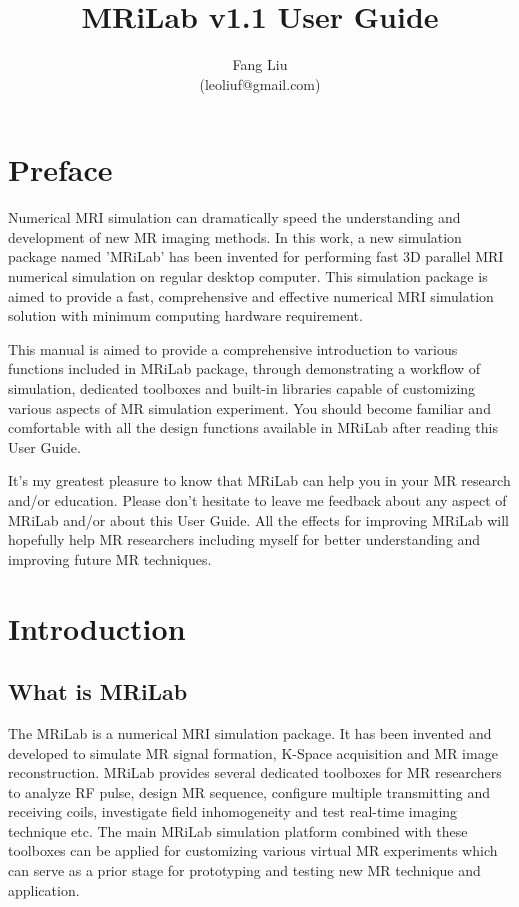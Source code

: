 \documentclass{book}%
\begin{document}
\frontmatter
\title{MRiLab v1.1 User Guide}
\author{Fang Liu \\ (leoliuf@gmail.com)}
\maketitle
\chapter*{Preface}

Numerical MRI simulation can dramatically speed the understanding and development of new MR imaging methods. In this work, a new simulation package named 'MRiLab' has been invented for performing fast 3D parallel MRI numerical simulation on regular desktop computer. This simulation package is aimed to provide a fast, comprehensive and effective numerical MRI simulation solution with minimum computing hardware requirement.

This manual is aimed to provide a comprehensive introduction to various functions included in MRiLab package, through demonstrating a workflow of simulation, dedicated toolboxes and built-in libraries capable of customizing various aspects of MR simulation experiment. You should become familiar and comfortable with all the design functions available in MRiLab after reading this User Guide.

It's my greatest pleasure to know that MRiLab can help you in your MR research and/or education. Please don't hesitate to leave me feedback about any aspect of MRiLab and/or about this User Guide. All the effects for improving MRiLab will hopefully help MR researchers including myself for better understanding and improving future MR techniques.

\mainmatter

\chapter{Introduction}
\section{What is MRiLab}
The MRiLab is a numerical MRI simulation package. It has been invented and developed to simulate MR signal formation, K-Space acquisition and MR image reconstruction. MRiLab provides several dedicated toolboxes for MR researchers to analyze RF pulse, design MR sequence, configure multiple transmitting and receiving coils, investigate field inhomogeneity and test real-time imaging technique etc. The main MRiLab simulation platform combined with these toolboxes can be applied for customizing various virtual MR experiments which can serve as a prior stage for prototyping and testing new MR technique and application.
\end{document}
